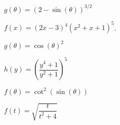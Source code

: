 \documentclass[10pt]{amsart}
\begin{document}
\begin{thm}
  \(g(\theta) = (2 - \sin(\theta))^{3/2}\)
\end{thm}

\newpage

\begin{thm}
  \(f(x) = (2x - 3)^4 (x^2 + x + 1)^5\).
\end{thm}
\vspace{1.5in}

\begin{thm}
  \(g(\theta) = \cos(\theta)^2\)
\end{thm}
\vspace{1.5in}

\begin{thm}
  \(h(y) = \left(\dfrac{y^4 + 1}{y^2 + 1}\right)^5\)
\end{thm}
  \vspace{1.5in}

\begin{thm}
  \(f(\theta) = \cot^2(\sin(\theta))\)
\end{thm}
  \vspace{1.5in}

\begin{thm}
  \(f(t) = \sqrt{\dfrac{t}{t^2 + 4}}\)
\end{thm}
\end{document}
